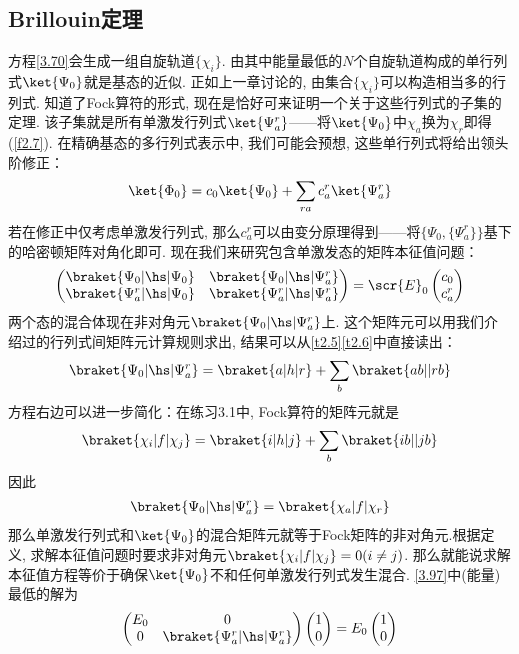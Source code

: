 \subsection{Brillouin定理}
\label{sec3.3.2}
\hft 方程\eqref{3.70}会生成一组自旋轨道$\{\chi_i\}$. 由其中能量最低的$N$个自旋轨道构成的单行列式$\ket{\Psi_0}$就是基态的\hft 近似. 正如上一章讨论的, 由集合$\{\chi_i\}$可以构造相当多的行列式. 知道了Fock算符的形式, 现在是恰好可来证明一个关于这些行列式的子集的定理. 该子集就是所有单激发行列式$\ket{\Psi_a^r}$——将$\ket{\Psi_0}$中$\chi_a$换为$\chi_r$即得(\ref{f2.7}). 在精确基态的多行列式表示中, 我们可能会预想, 这些单行列式将给出领头阶修正：
\begin{align}
\ket{\Phi_0} = c_0\ket{\Psi_0} + \sum_{ra}c_a^r\ket{\Psi_a^r}
\end{align}
若在修正中仅考虑单激发行列式, 那么$c_a^r$可以由变分原理得到——将$\{\Psi_0,\{\Psi_a^r\}\}$基下的哈密顿矩阵对角化即可. 现在我们来研究包含单激发态的矩阵本征值问题：
\begin{align}
\label{3.97}
\begin{pmatrix}
\braket{\Psi_0|\hs|\Psi_0} & \braket{\Psi_0|\hs|\Psi_a^r}\\
\braket{\Psi_a^r|\hs|\Psi_0} & \braket{\Psi_a^r|\hs|\Psi_a^r}\\
\end{pmatrix}
=\scr{E}_0
\begin{pmatrix}
c_0\\
c_a^r
\end{pmatrix}
\end{align}
两个态的混合体现在非对角元$\braket{\Psi_0|\hs|\Psi_a^r}$上. 这个矩阵元可以用我们介绍过的行列式间矩阵元计算规则求出, 结果可以从\ref{t2.5}\ref{t2.6}中直接读出：
\begin{align}
\braket{\Psi_0|\hs|\Psi_a^r} = \braket{a|h|r} + \sum_b\braket{ab||rb}
\end{align}
方程右边可以进一步简化：在练习3.1中, Fock算符的矩阵元就是
\begin{align}
\braket{\chi_i|f|\chi_j} = \braket{i|h|j} + \sum_b\braket{ib||jb}
\end{align} 
因此
\begin{align}
\braket{\Psi_0|\hs|\Psi_a^r} = \braket{\chi_a|f|\chi_r}
\end{align}
那么单激发行列式和$\ket{\Psi_0}$的混合矩阵元就等于Fock矩阵的非对角元.根据定义, 求解\hft 本征值问题时要求非对角元$\braket{\chi_i|f|\chi_j}=0(i\neq j)$. 那么就能说求解\hft 本征值方程等价于确保$\ket{\Psi_0}$不和任何单激发行列式发生混合. \eqref{3.97}中(能量)最低的解为
\begin{align}
\begin{pmatrix}
E_0 & 0\\
0   & \braket{\Psi_a^r|\hs|\Psi_a^r}
\end{pmatrix}
\begin{pmatrix}
1\\0
\end{pmatrix}
=E_0
\begin{pmatrix}
1\\0
\end{pmatrix}
\end{align}
